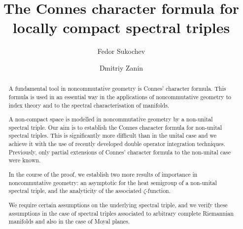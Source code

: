 \documentclass{amsbook}
\numberwithin{section}{chapter}
\numberwithin{equation}{chapter}
\begin{document}
\frontmatter

\title{The Connes character formula for locally compact spectral triples}

\author[Fedor Sukochev]{Fedor Sukochev}
\address{University of New South Wales, Kensington, NSW, 2052, Australia}
\author[Dmitriy Zanin]{Dmitriy Zanin}
\address{University of New South Wales, Kensington, NSW, 2052, Australia}

\date{}


\keywords{}


\begin{abstract} 
A fundamental tool in noncommutative geometry is Connes' character formula. This formula is used in an essential way in the applications of noncommutative geometry to index theory and to the spectral characterisation of manifolds. 
    
A non-compact space is modelled in noncommutative geometry by a non-unital spectral triple. Our aim is to establish the Connes character formula for non-unital spectral triples. This is significantly more difficult than in the unital case and we achieve it with the use of recently developed double operator integration techniques. Previously, only partial extensions of Connes' character formula to the non-unital case were known.
    
In the course of the proof, we establish two more results of importance in noncommutative geometry: an asymptotic for the heat semigroup of a non-unital spectral triple, and the analyticity of the associated $\zeta$-function.
    
We require certain assumptions on the underlying spectral triple, and we verify these assumptions in the case of spectral triples associated to arbitrary complete Riemannian manifolds and also in the case of Moyal planes.
    



\end{abstract}

\maketitle
\tableofcontents

\mainmatter






\appendix


\backmatter


\end{document}
